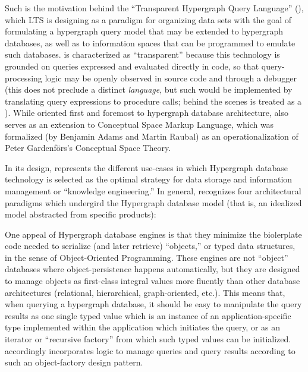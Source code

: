 \documentclass[12pt,letterpaper]{article}
\newcommand{\ATexttclr}[1]{\textcolor{tcolor}{\textbf{#1}}}
\newcommand{\THQL}{\resizebox{!}{8pt}{\ATexttclr{THQL}}}
\newcommand{\lTHQL}{\resizebox{!}{7.5pt}{\ATexttclr{T}}%
\resizebox{!}{8pt}{\ATexttclr{HQL}}}
\newcommand{\DSL}{\resizebox{!}{8pt}{\AcronymText{DSL}}}
\newcommand{\textscc}[1]{{\color{orr!35!black}{{%
{\textsc{\textbf{#1}}}}}}}
\newcommand{\AcronymText}[1]{{\textscc{#1}}}
\newcommand{\Cpp}{\resizebox{!}{8pt}{\AcronymText{C++}}}
\newcommand{\p}[1]{

\vspace{.7em}#1}
\newcommand{\q}[1]{{\fontfamily{qcr}\selectfont ``}#1{\fontfamily{qcr}\selectfont ''}}
\begin{document}
{\p{Such is the motivation behind the 
\q{Transparent Hypergraph Query Language} (\THQL{}), which LTS 
is designing as a paradigm for organizing data sets 
with the goal of formulating a hypergraph query model that 
may be extended to hypergraph databases, as well 
as to information spaces that can be programmed to 
emulate such databases.  \lTHQL{} is characterized as \q{transparent} 
because this technology is grounded on queries expressed 
and evaluated directly in \Cpp{} code, so that query-processing 
logic may be openly observed in source code and through a 
debugger (this does not preclude a distinct \THQL{} 
\textit{language}, but such would be implemented 
by translating query expressions to \Cpp{} procedure calls; 
behind the scenes \THQL{} is treated as a \Cpp{} \DSL{}).  
While oriented first and foremost to hypergraph database 
architecture, \THQL{} also serves as an extension 
to Conceptual Space Markup Language, which was 
formalized (by Benjamin Adams and Martin Raubal) 
as an operationalization of Peter Gardenf\"{o}rs's 
Conceptual Space Theory.}


\p{In its design, \THQL{} represents the different use-cases 
in which Hypergraph database technology is selected as the 
optimal strategy for data storage and information management 
or \q{knowledge engineering.}  In general, \THQL{} recognizes 
four architectural paradigms which undergird the Hypergraph database 
model (that is, an idealized model abstracted from specific products):

\begin{description}[itemsep=1pt]
\item[Object Serialization]  One appeal of Hypergraph database 
engines is that they minimize the biolerplate code needed to 
serialize (and later retrieve) \q{objects,} or typed data structures, 
in the sense of Object-Oriented Programming.  These engines are not 
\q{object} databases where object-persistence happens automatically, 
but they are designed to manage objects as first-class integral 
values more fluently than other database architectures 
(relational, hierarchical, graph-oriented, etc.).  This means 
that, when querying a hypergraph database, it should be 
easy to manipulate the query results as one single typed 
value which is an instance of an application-specific 
type implemented within the application which initiates 
the query, or as an iterator or \q{recursive factory} from which such 
typed values can be initialized.  \lTHQL{} accordingly incorporates 
logic to manage queries and query results according to such an 
object-factory design pattern.


\end{description}}}
\end{document}
